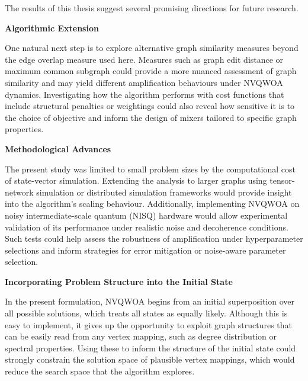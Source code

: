 The results of this thesis suggest several promising directions for future research.

\textbf{Algorithmic Extension}

One natural next step is to explore alternative graph similarity measures beyond the edge overlap measure used here. Measures such as graph edit distance or maximum common subgraph could provide a more nuanced assessment of graph similarity and may yield different amplification behaviours under NVQWOA dynamics. Investigating how the algorithm performs with cost functions that include structural penalties or weightings could also reveal how sensitive it is to the choice of objective and inform the design of mixers tailored to specific graph properties. 

\textbf{Methodological Advances}

The present study was limited to small problem sizes by the computational cost of state-vector simulation. Extending the analysis to larger graphs using tensor-network simulation or distributed simulation frameworks would provide  insight into the algorithm's scaling behaviour. Additionally, implementing NVQWOA on noisy intermediate-scale quantum (NISQ) hardware would allow experimental validation of its performance under realistic noise and decoherence conditions. Such tests could help assess the robustness of amplification under hyperparameter selections and inform strategies for error mitigation or noise-aware parameter selection.

\textbf{Incorporating Problem Structure into the Initial State}

In the present formulation, NVQWOA begins from an initial superposition over all possible solutions, which treats all states as equally likely. Although this is easy to implement, it gives up the opportunity to exploit graph structures that can be easily read from any vertex mapping, such as degree distribution or spectral properties. Using these to inform the structure of the initial state could strongly constrain the solution space of plausible vertex mappings, which would reduce the search space that the algorithm explores.